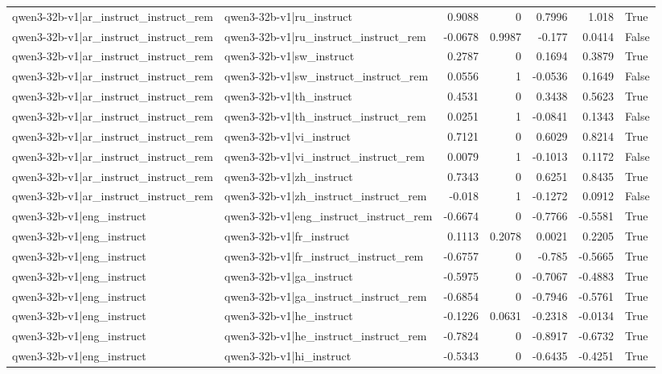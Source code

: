 \begin{table}
\begin{tabular}{l l r r r r l}
qwen3-32b-v1|ar_instruct_instruct_rem & qwen3-32b-v1|ru_instruct & 0.9088 & 0 & 0.7996 & 1.018 & True \\
qwen3-32b-v1|ar_instruct_instruct_rem & qwen3-32b-v1|ru_instruct_instruct_rem & -0.0678 & 0.9987 & -0.177 & 0.0414 & False \\
qwen3-32b-v1|ar_instruct_instruct_rem & qwen3-32b-v1|sw_instruct & 0.2787 & 0 & 0.1694 & 0.3879 & True \\
qwen3-32b-v1|ar_instruct_instruct_rem & qwen3-32b-v1|sw_instruct_instruct_rem & 0.0556 & 1 & -0.0536 & 0.1649 & False \\
qwen3-32b-v1|ar_instruct_instruct_rem & qwen3-32b-v1|th_instruct & 0.4531 & 0 & 0.3438 & 0.5623 & True \\
qwen3-32b-v1|ar_instruct_instruct_rem & qwen3-32b-v1|th_instruct_instruct_rem & 0.0251 & 1 & -0.0841 & 0.1343 & False \\
qwen3-32b-v1|ar_instruct_instruct_rem & qwen3-32b-v1|vi_instruct & 0.7121 & 0 & 0.6029 & 0.8214 & True \\
qwen3-32b-v1|ar_instruct_instruct_rem & qwen3-32b-v1|vi_instruct_instruct_rem & 0.0079 & 1 & -0.1013 & 0.1172 & False \\
qwen3-32b-v1|ar_instruct_instruct_rem & qwen3-32b-v1|zh_instruct & 0.7343 & 0 & 0.6251 & 0.8435 & True \\
qwen3-32b-v1|ar_instruct_instruct_rem & qwen3-32b-v1|zh_instruct_instruct_rem & -0.018 & 1 & -0.1272 & 0.0912 & False \\
qwen3-32b-v1|eng_instruct & qwen3-32b-v1|eng_instruct_instruct_rem & -0.6674 & 0 & -0.7766 & -0.5581 & True \\
qwen3-32b-v1|eng_instruct & qwen3-32b-v1|fr_instruct & 0.1113 & 0.2078 & 0.0021 & 0.2205 & True \\
qwen3-32b-v1|eng_instruct & qwen3-32b-v1|fr_instruct_instruct_rem & -0.6757 & 0 & -0.785 & -0.5665 & True \\
qwen3-32b-v1|eng_instruct & qwen3-32b-v1|ga_instruct & -0.5975 & 0 & -0.7067 & -0.4883 & True \\
qwen3-32b-v1|eng_instruct & qwen3-32b-v1|ga_instruct_instruct_rem & -0.6854 & 0 & -0.7946 & -0.5761 & True \\
qwen3-32b-v1|eng_instruct & qwen3-32b-v1|he_instruct & -0.1226 & 0.0631 & -0.2318 & -0.0134 & True \\
qwen3-32b-v1|eng_instruct & qwen3-32b-v1|he_instruct_instruct_rem & -0.7824 & 0 & -0.8917 & -0.6732 & True \\
qwen3-32b-v1|eng_instruct & qwen3-32b-v1|hi_instruct & -0.5343 & 0 & -0.6435 & -0.4251 & True \\

\end{tabular}
\end{table}
